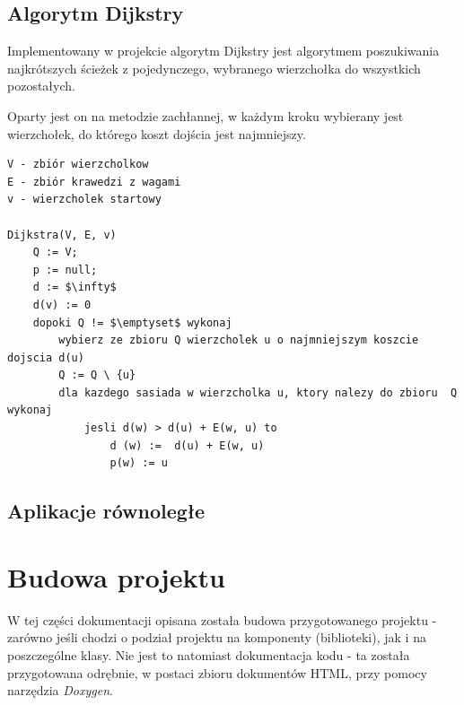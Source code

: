 \documentclass[12pt]{article}
\begin{document}
\subsection{Algorytm Dijkstry}
Implementowany w projekcie algorytm Dijkstry jest algorytmem poszukiwania najkrótszych ścieżek z pojedynczego, wybranego wierzchołka do wszystkich pozostałych. 

Oparty jest on na metodzie zachłannej, w każdym kroku wybierany jest wierzchołek, do którego koszt dojścia jest najmniejszy. 

\begin{lstlisting}[caption={Pseudokod algorytmu Dijkstry.}, captionpos=b, mathescape=true]
V - zbiór wierzcholkow
E - zbiór krawedzi z wagami
v - wierzcholek startowy

Dijkstra(V, E, v)
	Q := V;
	p := null;
	d := $\infty$
	d(v) := 0
	dopoki Q != $\emptyset$ wykonaj
		wybierz ze zbioru Q wierzcholek u o najmniejszym koszcie dojscia d(u)
		Q := Q \ {u}
		dla kazdego sasiada w wierzcholka u, ktory nalezy do zbioru  Q wykonaj
			jesli d(w) > d(u) + E(w, u) to
				d (w) :=  d(u) + E(w, u)
				p(w) := u
\end{lstlisting}


\subsection{Aplikacje równoległe}

\section{Budowa projektu}
W tej części dokumentacji opisana została budowa przygotowanego projektu - zarówno jeśli chodzi o podział projektu na komponenty (biblioteki), jak i na poszczególne klasy. Nie jest to natomiast dokumentacja kodu - ta została przygotowana odrębnie, w postaci zbioru dokumentów HTML, przy pomocy narzędzia \textit{Doxygen}.
\end{document}
